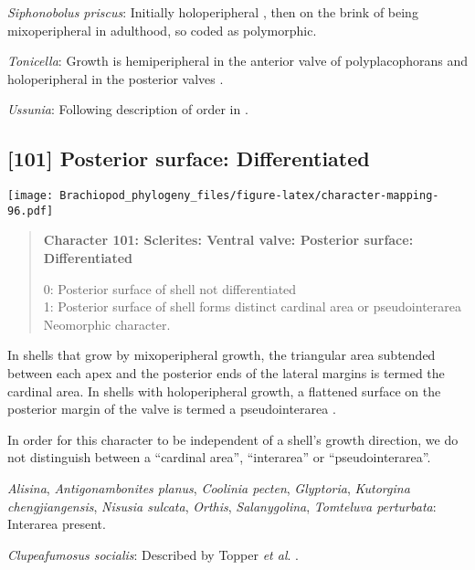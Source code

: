 \documentclass[openany]{book}
\theoremstyle{definition}
\theoremstyle{definition}
\theoremstyle{definition}
\theoremstyle{remark}
\begin{document}
\hypertarget{Siphonobolus_priscus-coding-100}{}
\emph{Siphonobolus priscus}: Initially holoperipheral
\citep[p.~159]{Popov2009Earlyontogeny}, then on the brink of being
mixoperipheral in adulthood, so coded as polymorphic.

\hypertarget{Tonicella-coding-100}{}
\emph{Tonicella}: Growth is hemiperipheral in the anterior valve of
polyplacophorans and holoperipheral in the posterior valves
\citep{Schwabe2010, Connors2012}.

\hypertarget{Ussunia-coding-100}{}
\emph{Ussunia}: Following description of order in
\citet{Williams2000LinguliformeaCraniiformea}.

\subsection*{{[}101{]} Posterior surface:
Differentiated}\label{posterior-surface-differentiated-1}

\texttt{[image: Brachiopod\_phylogeny\_files/figure-latex/character-mapping-96.pdf]}

\begin{quote}
\textbf{Character 101: Sclerites: Ventral valve: Posterior surface:
Differentiated}

0: Posterior surface of shell not differentiated\\
1: Posterior surface of shell forms distinct cardinal area or
pseudointerarea\\
Neomorphic character.
\end{quote}

In shells that grow by mixoperipheral growth, the triangular area
subtended between each apex and the posterior ends of the lateral
margins is termed the cardinal area. In shells with holoperipheral
growth, a flattened surface on the posterior margin of the valve is
termed a pseudointerarea
\citep[paraphrasing][]{Williams1997Introduction}.

In order for this character to be independent of a shell's growth
direction, we do not distinguish between a ``cardinal area'',
``interarea'' or ``pseudointerarea''.

\hypertarget{Alisina-coding-101}{}
\emph{Alisina}, \emph{Antigonambonites planus}, \emph{Coolinia pecten},
\emph{Glyptoria}, \emph{Kutorgina chengjiangensis}, \emph{Nisusia
sulcata}, \emph{Orthis}, \emph{Salanygolina}, \emph{Tomteluva
perturbata}: Interarea present.

\hypertarget{Clupeafumosus_socialis-coding-101}{}
\emph{Clupeafumosus socialis}: Described by Topper \emph{et al}.
\citeyearpar{Topper2013Reappraisalof}.
\end{document}
